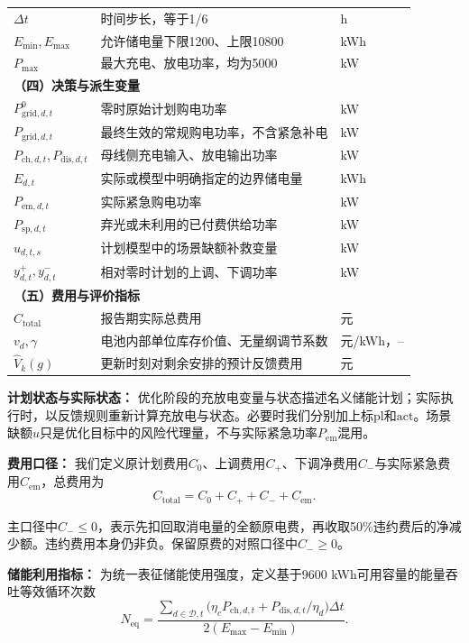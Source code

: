 \documentclass[UTF8,fontset=none,a4paper,zihao=-4]{ctexart}
\newcommand{\dd}{\Delta t}
\newcommand{\Emin}{E_{\min}}
\newcommand{\Emax}{E_{\max}}
\begin{document}
\begin{center}
\begin{longtable}{p{3.7cm}p{8.0cm}p{2.0cm}}
\(\dd\) & 时间步长，等于1/6 & h\\
\(\Emin,\Emax\) & 允许储电量下限1200、上限10800 & kWh\\
\(P_{\max}\) & 最大充电、放电功率，均为5000 & kW\\
\midrule
\multicolumn{3}{l}{\textbf{（四）决策与派生变量}}\\
\(P_{\mathrm{grid},d,t}^{0}\) & 零时原始计划购电功率 & kW\\
\(P_{\mathrm{grid},d,t}\) & 最终生效的常规购电功率，不含紧急补电 & kW\\
\(P_{\mathrm{ch},d,t},P_{\mathrm{dis},d,t}\) & 母线侧充电输入、放电输出功率 & kW\\
\(E_{d,t}\) & 实际或模型中明确指定的边界储电量 & kWh\\
\(P_{\mathrm{em},d,t}\) & 实际紧急购电功率 & kW\\
\(P_{\mathrm{sp},d,t}\) & 弃光或未利用的已付费供给功率 & kW\\
\(u_{d,t,s}\) & 计划模型中的场景缺额补救变量 & kW\\
\(y_{d,t}^{+},y_{d,t}^{-}\) & 相对零时计划的上调、下调功率 & kW\\
\midrule
\multicolumn{3}{l}{\textbf{（五）费用与评价指标}}\\
\(C_{\mathrm{total}}\) & 报告期实际总费用 & 元\\
\(v_d,\gamma\) & 电池内部单位库存价值、无量纲调节系数 & 元/kWh，--\\
\(\widehat V_k(g)\) & 更新时刻对剩余安排的预计反馈费用 & 元\\
\bottomrule
\end{longtable}\end{center}
\par\textbf{计划状态与实际状态：}
优化阶段的充放电变量与状态描述名义储能计划；实际执行时，以反馈规则重新计算充放电与状态。必要时我们分别加上标\(\mathrm{pl}\)和\(\mathrm{act}\)。场景缺额\(u\)只是优化目标中的风险代理量，不与实际紧急功率\(P_{\mathrm{em}}\)混用。

\par\textbf{费用口径：}
我们定义原计划费用\(C_0\)、上调费用\(C_+\)、下调净费用\(C_-\)与实际紧急费用\(C_{\mathrm{em}}\)，总费用为
\begin{equation}\label{eq:total}
C_{\mathrm{total}}=C_0+C_++C_-+C_{\mathrm{em}}.
\end{equation}

主口径中\(C_-\le0\)，表示先扣回取消电量的全额原电费，再收取50\%违约费后的净减少额。违约费用本身仍非负。保留原费的对照口径中\(C_-\ge0\)。
\par\textbf{储能利用指标：}
为统一表征储能使用强度，定义基于9600 kWh可用容量的能量吞吐等效循环次数
\begin{equation}\label{eq:cycle}
N_{\mathrm{eq}}=\frac{\sum_{d\in\mathcal D,t}\bigl(\eta_cP_{\mathrm{ch},d,t}+P_{\mathrm{dis},d,t}/\eta_d\bigr)\dd}{2(\Emax-\Emin)}.
\end{equation}
\end{document}
